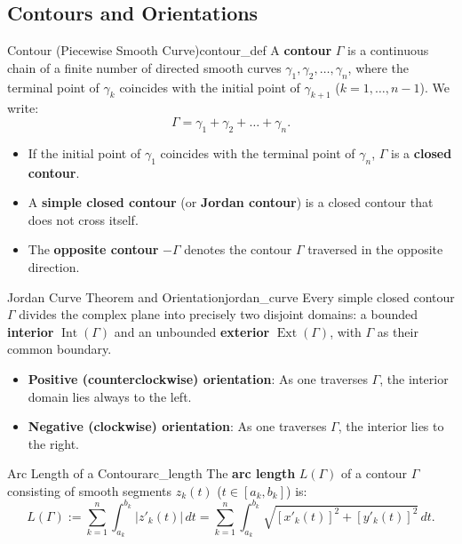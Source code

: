 \subsection{Contours and Orientations}

\begin{definition}{Contour (Piecewise Smooth Curve)}{contour_def}
A \textbf{contour} $\Gamma$ is a continuous chain of a finite number of directed smooth curves $\gamma_1, \gamma_2, \dots, \gamma_n$, where the terminal point of $\gamma_k$ coincides with the initial point of $\gamma_{k+1}$ ($k = 1, \dots, n-1$). We write:
\begin{equation}
\Gamma = \gamma_1 + \gamma_2 + \dots + \gamma_n.
\end{equation}
\begin{itemize}
    \item If the initial point of $\gamma_1$ coincides with the terminal point of $\gamma_n$, $\Gamma$ is a \textbf{closed contour}.
    \item A \textbf{simple closed contour} (or \textbf{Jordan contour}) is a closed contour that does not cross itself.
    \item The \textbf{opposite contour} $-\Gamma$ denotes the contour $\Gamma$ traversed in the opposite direction.
\end{itemize}
\end{definition}

\begin{theorem}{Jordan Curve Theorem and Orientation}{jordan_curve}
Every simple closed contour $\Gamma$ divides the complex plane into precisely two disjoint domains: a bounded \textbf{interior} $\operatorname{Int}(\Gamma)$ and an unbounded \textbf{exterior} $\operatorname{Ext}(\Gamma)$, with $\Gamma$ as their common boundary.
\begin{itemize}
    \item \textbf{Positive (counterclockwise) orientation}: As one traverses $\Gamma$, the interior domain lies always to the left.
    \item \textbf{Negative (clockwise) orientation}: As one traverses $\Gamma$, the interior lies to the right.
\end{itemize}
\end{theorem}

\begin{definition}{Arc Length of a Contour}{arc_length}
The \textbf{arc length} $L(\Gamma)$ of a contour $\Gamma$ consisting of smooth segments $z_k(t)$ ($t \in [a_k, b_k]$) is:
\begin{equation}
L(\Gamma) := \sum_{k=1}^n \int_{a_k}^{b_k} |z'_k(t)|\, dt = \sum_{k=1}^n \int_{a_k}^{b_k} \sqrt{[x'_k(t)]^2 + [y'_k(t)]^2}\, dt.
\end{equation}
\end{definition}


